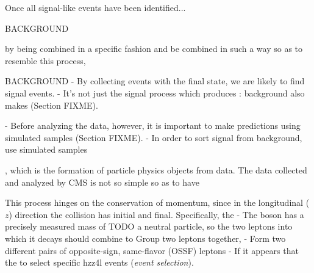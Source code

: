 Once all signal-like events have been identified...

BACKGROUND

by being combined in a specific fashion and be combined in such a way so as to resemble this process, \eg 


BACKGROUND
- By collecting events with the \fourl final state, we are likely to find signal events.
    - It's not just the signal process which produces \fourl: background also makes \fourl (Section FIXME).

- Before analyzing the data, however, it is important to make predictions using simulated samples (Section FIXME).
- In order to sort signal from background, use simulated samples 

, which is the formation of particle physics objects from data.
The data collected and analyzed by CMS is not so simple so as to have \htozz

This process hinges on the conservation of momentum, since in the longitudinal ($z$) direction the \pp collision has initial and final.
Specifically, the 
    - The \PZ boson has a precisely measured mass of TODO a neutral particle, so the two leptons into which it decays should combine to Group two leptons together, 
    - Form two different pairs of opposite-sign, same-flavor (OSSF) leptons
    - If it appears that the to select specific hzz4l events (\emph{event selection}).